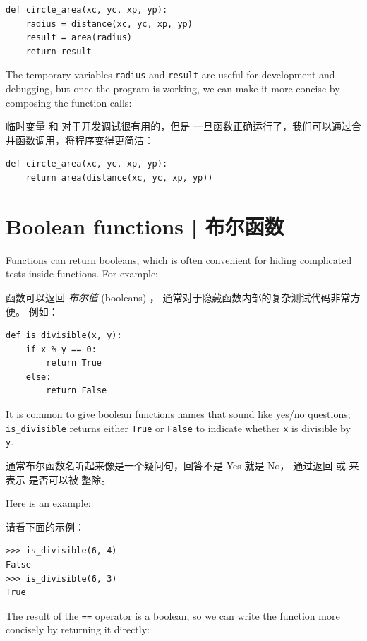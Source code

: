 \begin{lstlisting}
def circle_area(xc, yc, xp, yp):
    radius = distance(xc, yc, xp, yp)
    result = area(radius)
    return result
\end{lstlisting}

%
The temporary variables {\tt radius} and {\tt result} are useful for
development and debugging, but once the program is working, we can
make it more concise by composing the function calls:

临时变量  和  对于开发调试很有用的，但是
一旦函数正确运行了，我们可以通过合并函数调用，将程序变得更简洁：

\begin{lstlisting}
def circle_area(xc, yc, xp, yp):
    return area(distance(xc, yc, xp, yp))
\end{lstlisting}

%

\section{Boolean functions  |  布尔函数}
\label{boolean}

Functions can return booleans, which is often convenient for hiding
complicated tests inside functions.  
For example:

函数可以返回 {\em 布尔值} (booleans) ， 通常对于隐藏函数内部的复杂测试代码非常方便。 例如：

\begin{lstlisting}
def is_divisible(x, y):
    if x % y == 0:
        return True
    else:
        return False
\end{lstlisting}


It is common to give boolean functions names that sound like yes/no
questions; \verb"is_divisible" returns either {\tt True} or {\tt False}
to indicate whether {\tt x} is divisible by {\tt y}.

通常布尔函数名听起来像是一个疑问句，回答不是 Yes 就是 No，  通过返回  或  来表示  是否可以被  整除。

Here is an example:

请看下面的示例：

\begin{lstlisting}
>>> is_divisible(6, 4)
False
>>> is_divisible(6, 3)
True
\end{lstlisting}

The result of the {\tt ==} operator is a boolean, so we can write the
function more concisely by returning it directly:

